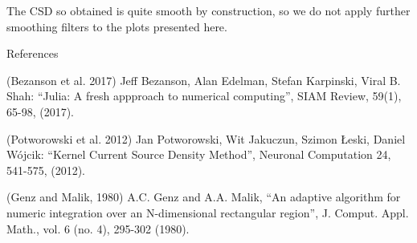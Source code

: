              The CSD so obtained is quite smooth by construction, so we do not apply further smoothing filters to the plots presented here.
          

            References

            (Bezanson et al. 2017)  Jeff Bezanson, Alan Edelman, Stefan Karpinski, Viral B. Shah:
            ``Julia: A fresh appproach to numerical computing'', SIAM Review, 59(1), 65-98, (2017).

            (Potworowski et al. 2012) Jan Potworowski, Wit Jakuczun, Szimon Łeski, Daniel Wójcik:
            ``Kernel Current Source Density Method'', Neuronal Computation 24, 541-575, (2012). 

             (Genz and Malik, 1980) A.C. Genz and A.A. Malik,  ``An adaptive algorithm for numeric integration over an N-dimensional rectangular region'', J. Comput. Appl. Math., vol. 6 (no. 4), 295-302 (1980).
